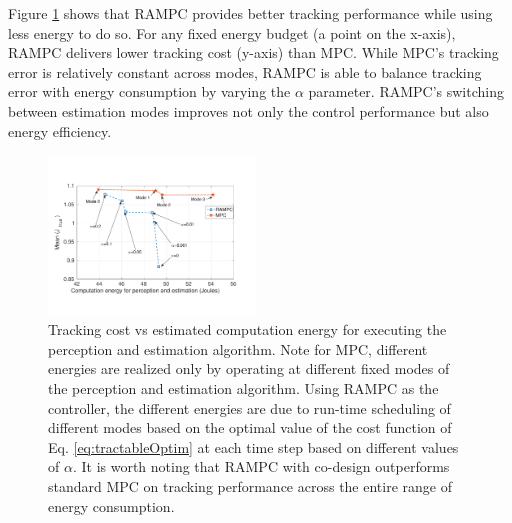 Figure \ref{fig:TrackingVsEnergy} shows that RAMPC provides better tracking performance while using less energy to do so. For any fixed energy budget (a point on the x-axis), RAMPC delivers lower tracking cost (y-axis) than MPC. While MPC's tracking error is relatively constant across modes, RAMPC is able to balance tracking error with energy consumption by varying the $\alpha$ parameter. RAMPC's switching between estimation modes improves not only the control performance but also energy efficiency.


\begin{figure}[tb]
	\centering
	\includegraphics[width=0.49\textwidth, trim = 0 20mm 0 0]{figures/TrackingVsEnergy}
	\caption{Tracking cost vs estimated computation energy for executing the perception and estimation algorithm. Note for MPC, different energies are realized only by operating at different fixed modes of the perception and estimation algorithm. Using RAMPC as the controller, the different energies are due to run-time scheduling of different modes based on the optimal value of the cost function of Eq. \ref{eq:tractableOptim} at each time step based on different values of $\alpha$. It is worth noting that RAMPC with co-design outperforms standard MPC on tracking performance across the entire range of energy consumption.}
	\label{fig:TrackingVsEnergy}
\end{figure}


